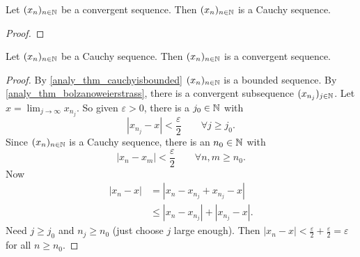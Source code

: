 \documentclass[10pt, a4paper]{article}
\newcommand{\seq}[1][x]{(#1_n)_{n \in \N}}
\begin{document}
\begin{theorem}
    Let $\seq$ be a convergent sequence.
    Then $\seq$ is a Cauchy sequence.
    \begin{proof}
        
    \end{proof}
\end{theorem}

\begin{theorem}
    Let $\seq$ be a Cauchy sequence.
    Then $\seq$ is a convergent sequence.
    \begin{proof}
        By \autoref{analy_thm_cauchyisbounded} $\seq$ is a bounded sequence.
        By \autoref{analy_thm_bolzanoweierstrass},
        there is a convergent subsequence $(x_{n_j})_{j \in \mathbb{N}}$.
        Let $x = \lim_{j \rightarrow \infty}x_{n_j}$.
        So given $\varepsilon > 0$,
        there is a $j_0 \in \mathbb{N}$ with
        \[
        |x_{n_j} - x| < \frac{\varepsilon}{2}\qquad\forall j \geq j_0.
        \]
        Since $\seq$ is a Cauchy sequence,
        there is an $n_0 \in \mathbb{N}$ with
        \[
        |x_n - x_m| < \frac{\varepsilon}{2}\qquad\forall n, m \geq n_0.
        \]
        Now
        \begin{align*}
            |x_n - x| &= |x_n - x_{n_j} + x_{n_j} - x| \\
            &\leq |x_n - x_{n_j}| + |x_{n_j} - x|.
        \end{align*}
        Need $j \geq j_0$ and $n_j \geq n_0$
        (just choose $j$ large enough).
        Then $|x_n - x| < \frac{\varepsilon}{2} + \frac{\varepsilon}{2} = \varepsilon$ for all $n \geq n_0$.
    \end{proof}
\end{theorem}
\end{document}
